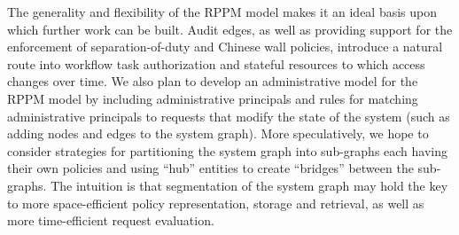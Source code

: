 \documentclass{article}
\begin{document}
The generality and flexibility of the RPPM model makes it an ideal basis upon which further work can be built.
Audit edges, as well as providing support for the enforcement of separation-of-duty and Chinese wall policies, introduce a natural route into workflow task authorization and stateful resources to which access changes over time.
We also plan to develop an administrative model for the RPPM model by including administrative principals and rules for matching administrative principals to requests that modify the state of the system (such as adding nodes and edges to the system graph).
More speculatively, we hope to consider strategies for partitioning the system graph into sub-graphs each having their own policies and using ``hub'' entities to create ``bridges'' between the sub-graphs.
The intuition is that segmentation of the system graph may hold the key to more space-efficient policy representation, storage and retrieval, as well as more time-efficient request evaluation.



\end{document}
